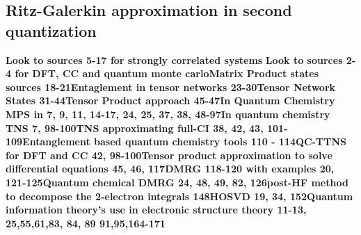 \documentclass[10pt, draft]{article}
\begin{document}
 \subsection{Ritz-Galerkin approximation in second quantization}
  \linebreak[1]  



\textbf{Look to sources 5-17 for strongly correlated systems} \linebreak[1]
 \textbf{Look to sources 2-4 for DFT, CC and quantum monte carlo}\linebreak[1]
 \textbf{Matrix Product states sources 18-21}\linebreak[1]
 \textbf{Entaglement in tensor networks 23-30}\linebreak[1]
 \textbf{Tensor Network States 31-44}\linebreak[1]
 \textbf{Tensor Product approach 45-47}\linebreak[1]
 \textbf{In Quantum Chemistry MPS in 7, 9, 11, 14-17, 24, 25, 37, 38, 48-97}\linebreak[1]
 \textbf{In quantum chemistry TNS 7, 98-100}\linebreak[1]
 \textbf{TNS approximating full-CI 38, 42, 43, 101-109}\linebreak[1]
 \textbf{Entanglement based quantum chemistry tools 110 - 114}\linebreak[1]
 \textbf{QC-TTNS for DFT and CC 42, 98-100}\linebreak[1]
 \textbf{Tensor product approximation to solve differential equations 45, 46, 117}\linebreak[1]
 \textbf{DMRG 118-120 with examples 20, 121-125}\linebreak[1]
 \textbf{Quantum chemical DMRG 24, 48, 49, 82, 126}\linebreak[1]
 \textbf{post-HF method to decompose the 2-electron integrals 148}\linebreak[1]
 \textbf{HOSVD 19, 34, 152}\linebreak[1]
 \textbf{Quantum information theory's use in electronic structure theory 11-13, 25,55,61,83, 84, 89 91,95,164-171}\linebreak[1]
  
\end{document}
